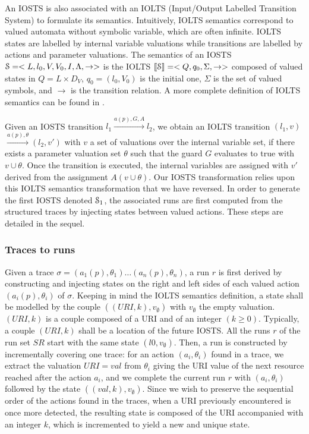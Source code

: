 An IOSTS is also associated with an IOLTS (Input/Output Labelled
Transition System) to formulate its semantics. Intuitively, IOLTS
semantics correspond to valued automata without symbolic
variable, which are often infinite. IOLTS states are labelled by
internal variable valuations while transitions are labelled by
actions and parameter valuations. The semantics of an IOSTS
$\EuScript{S}=<L,l_0,V,V_0,I,\Lambda,\rightarrow>$ is the IOLTS
$\llbracket \EuScript{S}\rrbracket = <Q,q_0,\Sigma,\rightarrow>$
composed of valued states in $Q = L \times D_V$, $q_0=(l_0,V_0)$
is the initial one, $\Sigma$ is the set of valued symbols, and
$\rightarrow$ is the transition relation. A more complete
definition of IOLTS semantics can be found in \cite{FTW05}.

Given an IOSTS transition $l_1 \xrightarrow{a(p),G,A}l_2$, we
obtain an IOLTS transition $(l_1,v)$ $\xrightarrow{a(p),\theta}
(l_2,v')$ with $v$ a set of valuations over the internal variable
set, if there exists a parameter valuation set $\theta$ such that
the guard $G$ evaluates to true with $v \cup \theta$. Once the
transition is executed, the internal variables are assigned with
$v'$ derived from the assignment $A(v \cup \theta)$.
Our IOSTS transformation relies upon this IOLTS semantics
transformation that we have reversed.  In order to generate the
first IOSTS denoted $\EuScript{S}_1$, the associated runs are
first computed from the structured traces by injecting states
between valued actions. These steps are detailed in the
sequel.

\subsubsection{Traces to runs}

Given a trace $\sigma = (a_1(p),\theta_1) \dots
(a_n(p),\theta_n)$, a run $r$ is first derived by constructing
and injecting states on the right and left sides of
each valued action $(a_i(p),\theta_i)$ of $\sigma$. Keeping in
mind the IOLTS semantics definition, a state shall be modelled by
the couple $((URI,k),v_\emptyset)$ with $v_\emptyset$ the empty
valuation.  $(URI,k)$ is a couple composed of a URI and of an
integer $(k \geq 0)$. Typically, a couple $(URI,k)$ shall be a
location of the future IOSTS. All the runs $r$ of the run set
$SR$ start with the same state $(l0,v_\emptyset)$. Then, a run is
constructed by incrementally covering one trace: for an action
$(a_i,\theta_i)$ found in a trace, we extract the valuation
$URI=val$ from $\theta_i$ giving the URI value of the next
resource reached after the action $a_i$, and we complete the
current run $r$ with $(a_i,\theta_i)$ followed by the state
$((val,k),v_\emptyset)$.  Since we wish to preserve the
sequential order of the actions found in the traces, when a URI
previously encountered is once more detected, the resulting state
is composed of the URI accompanied with an integer $k$, which is
incremented to yield a new and unique state.

